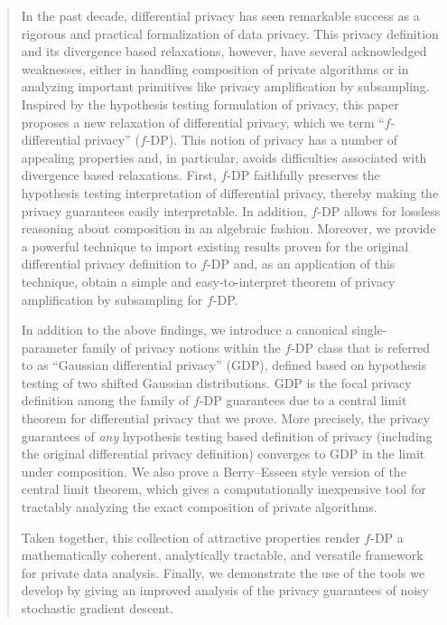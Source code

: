 \documentclass[11pt]{article}
\theoremstyle{remark}
\begin{document}
\vspace{0.3cm}
\begin{abstract}
In the past decade, differential privacy has seen remarkable success as a rigorous and practical formalization of data privacy. This privacy definition and its divergence based relaxations, however, have several acknowledged weaknesses, either in handling composition of private algorithms or in analyzing important primitives like privacy amplification by subsampling. Inspired by the hypothesis testing formulation of privacy, this paper proposes a new relaxation of differential privacy, which we term ``$f$-differential privacy'' ($f$-DP). This notion of privacy has a number of appealing properties and, in particular, avoids difficulties associated with divergence based relaxations. First, $f$-DP faithfully preserves the hypothesis testing interpretation of differential privacy, thereby making the privacy
guarantees easily interpretable. In addition, $f$-DP allows for lossless reasoning about composition in an algebraic fashion. Moreover, we provide a powerful technique to import existing results proven for the original differential
privacy definition to $f$-DP and, as an application of this technique, obtain a simple and easy-to-interpret theorem of privacy amplification by subsampling for $f$-DP.


In addition to the above findings, we introduce a canonical single-parameter family of privacy notions within the $f$-DP class that is referred to as ``Gaussian differential privacy'' (GDP), defined based on hypothesis testing of two shifted Gaussian distributions. GDP is the focal privacy definition among the family of $f$-DP guarantees due to a central limit theorem for differential privacy that we prove. More precisely, the privacy guarantees of \emph{any} hypothesis testing based definition of privacy (including the original differential privacy definition) converges to GDP in the limit under composition. We also prove a Berry--Esseen style version of the central limit theorem, which gives a computationally inexpensive tool for tractably analyzing the exact composition of private algorithms.

Taken together, this collection of attractive properties render $f$-DP a mathematically coherent, analytically tractable, and versatile framework for private data analysis. Finally, we demonstrate the use of the tools we develop by giving an improved analysis of the privacy guarantees of noisy stochastic gradient descent.
\end{abstract}
\end{document}
